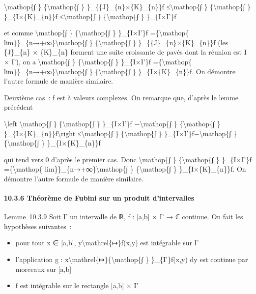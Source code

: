 \documentclass[]{article}
\begin{document}
\textbackslash{}mathop\{∫ \} \{\textbackslash{}mathop\{∫ \}
\}\_\{\{J\}\_\{n\}×\{K\}\_\{n\}\}f ≤\textbackslash{}mathop\{∫ \}
\{\textbackslash{}mathop\{∫ \} \}\_\{I×\{K\}\_\{n\}\}f
≤\textbackslash{}mathop\{∫ \} \{\textbackslash{}mathop\{∫ \}
\}\_\{I×I'\}f

et comme \textbackslash{}mathop\{∫ \} \{\textbackslash{}mathop\{∫ \}
\}\_\{I×I'\}f =\{\textbackslash{}mathop\{
lim\}\}\_\{n→+∞\}\textbackslash{}mathop\{∫ \}
\{\textbackslash{}mathop\{∫ \} \}\_\{\{J\}\_\{n\}×\{K\}\_\{n\}\}f (les
\{J\}\_\{n\} × \{K\}\_\{n\} forment une suite croissante de pavés dont
la réunion est I × I'), on a \textbackslash{}mathop\{∫ \}
\{\textbackslash{}mathop\{∫ \} \}\_\{I×I'\}f =\{\textbackslash{}mathop\{
lim\}\}\_\{n→+∞\}\textbackslash{}mathop\{∫ \}
\{\textbackslash{}mathop\{∫ \} \}\_\{I×\{K\}\_\{n\}\}f. On démontre
l'autre formule de manière similaire.

Deuxième cas~: f est à valeurs complexes. On remarque que, d'après le
lemme précédent

\textbackslash{}left \textbar{}\textbackslash{}mathop\{∫ \}
\{\textbackslash{}mathop\{∫ \} \}\_\{I×I'\}f −\textbackslash{}mathop\{∫
\} \{\textbackslash{}mathop\{∫ \}
\}\_\{I×\{K\}\_\{n\}\}f\textbackslash{}right
\textbar{}≤\textbackslash{}mathop\{∫ \} \{\textbackslash{}mathop\{∫ \}
\}\_\{I×I'\}\textbar{}f\textbar{}−\textbackslash{}mathop\{∫ \}
\{\textbackslash{}mathop\{∫ \}
\}\_\{I×\{K\}\_\{n\}\}\textbar{}f\textbar{}

qui tend vers 0 d'après le premier cas. Donc \textbackslash{}mathop\{∫
\} \{\textbackslash{}mathop\{∫ \} \}\_\{I×I'\}f
=\{\textbackslash{}mathop\{ lim\}\}\_\{n→+∞\}\textbackslash{}mathop\{∫
\} \{\textbackslash{}mathop\{∫ \} \}\_\{I×\{K\}\_\{n\}\}f. On démontre
l'autre formule de manière similaire.

\paragraph{10.3.6 Théorème de Fubini sur un produit d'intervalles}

Lemme~10.3.9 Soit I' un intervalle de ℝ, f : {[}a,b{]} × I' → ℂ
continue. On fait les hypothèses suivantes~:

\begin{itemize}
\itemsep1pt\parskip0pt
\item
  pour tout x ∈ {[}a,b{]}, y\textbackslash{}mathrel\{↦\}f(x,y) est
  intégrable sur I'
\item
  l'application g :
  x\textbackslash{}mathrel\{↦\}\{\textbackslash{}mathop\{∫ \}
  \}\_\{I'\}f(x,y) dy est continue par morceaux sur {[}a,b{]}
\item
  f est intégrable sur le rectangle {[}a,b{]} × I'
\end{itemize}
\end{document}
